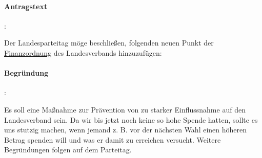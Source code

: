 

\paragraph{Antragstext}:

Der Landesparteitag möge beschließen, folgenden neuen Punkt der \href{http://wiki.piratenpartei.de/LSA:Satzung#Abschnitt_B:_Finanzordnung}{Finanzordnung} des Landesverbands hinzuzufügen:


\paragraph{Begründung}:

Es soll eine Maßnahme zur Prävention von zu starker Einflussnahme auf den Landesverband sein. Da wir bis jetzt noch keine so hohe Spende hatten, sollte es uns stutzig machen, wenn jemand z. B. vor der nächsten Wahl einen höheren Betrag spenden will und was er damit zu erreichen versucht. Weitere Begründungen folgen auf dem Parteitag.
